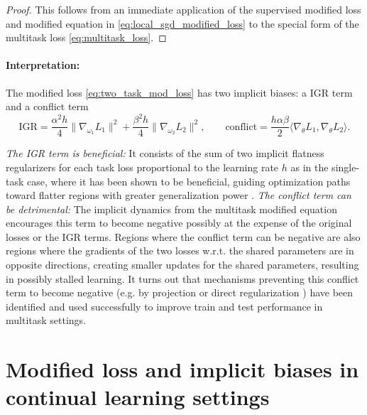 \documentclass{article}
\begin{document}
\begin{proof}
This follows from an immediate application of the supervised modified loss and modified equation in \eqref{eq:local_sgd_modified_loss} to the special form of the multitask loss \eqref{eq:multitask_loss}.
\end{proof}


\paragraph{Interpretation:} The modified loss \eqref{eq:two_task_mod_loss} has two implicit biases: a IGR term and a conflict term 
\begin{equation*}
\mathrm{IGR} 
= \frac{\alpha^2h}4 \|\nabla_{\omega_1} L_1\|^2
+ \frac{\beta^2h} 4 \|\nabla_{\omega_2} L_2\|^2,
\quad\quad
\mathrm{conflict} = 
\frac{h\alpha\beta}2  \langle \nabla_\theta L_1, \nabla_\theta L_2 \rangle.
\end{equation*}

\emph{The IGR term is beneficial:} It consists of the sum of two implicit flatness regularizers for each task loss proportional to the learning rate $h$ as in the single-task case, where it has been shown  to be beneficial, guiding optimization paths toward flatter regions with greater generalization power \cite{barrett2021implicit,smith2021on}.  
\emph{The conflict term  can be detrimental:} The implicit dynamics from the multitask modified equation encourages this term to become negative possibly at the expense of the original losses or the IGR terms. Regions where the conflict term can be negative are also regions where the gradients of the two losses w.r.t. the shared parameters are in opposite directions, creating smaller updates for the shared parameters, resulting in possibly stalled learning. It turns out that mechanisms preventing this conflict term to become negative (e.g. by projection \cite{wang2021gradient_vaccine,anguelov2020_pick_a_sign,yu2020gradient_surgery} or direct regularization \cite{lee2022sequential}) have been identified and used successfully to improve train and test performance in multitask settings.



\section{Modified loss and implicit biases in continual learning settings}
\end{document}
